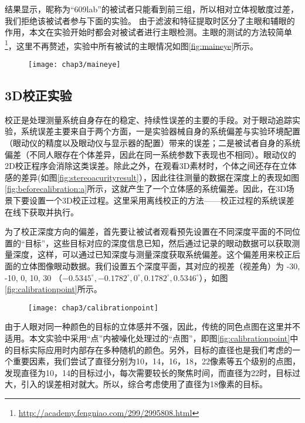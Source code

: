 结果显示，昵称为“609lab”的被试者只能看到前三组，所以相对立体视敏度过差，我们拒绝该被试者参与下面的实验。
由于滤波和特征提取时区分了主眼和辅眼的作用，本文在实验开始时都会对被试者进行主眼检测。主眼的测试的方法较简单\footnote{\url{http://academy.fengniao.com/299/2995808.html}}，这里不再赘述，实验中所有被试的主眼情况如图\ref{fig:maineye}所示。
\begin{figure}[!htp]
  \centering
  \texttt{[image: chap3/maineye]}
\end{figure}
\subsection{3D校正实验}
\label{sec:3dcalibrationexperiment}
校正是处理测量系统自身存在的稳定、持续性误差的主要的手段。对于眼动追踪实验，系统误差主要来自于两个方面，一是实验器械自身的系统偏差与实验环境配置（眼动仪的精度以及眼动仪与显示器的配置）带来的误差；二是被试者自身的系统偏差（不同人眼存在个体差异，因此在同一系统参数下表现也不相同）。眼动仪的2D校正程序会消除这类误差。除此之外，在观看3D素材时，个体之间还存在立体感的差异(如图\ref{fig:stereoacurityresult}），因此往往测量的数据在深度上的表现如图\ref{fig:beforecalibration:a}所示，这就产生了一个立体感的系统偏差。因此，在3D场景下要设置一个3D校正过程。这里采用离线校正的方法——校正过程的系统误差在线下获取并执行。

为了校正深度方向的偏差，首先要让被试者观看预先设置在不同深度平面的不同位置的“目标”，这些目标对应的深度信息已知，然后通过记录的眼动数据可以获取测量深度，这样，可以通过已知深度与测量深度获取系统偏差。这个偏差用来校正后面的立体图像眼动数据。我们设置五个深度平面，其对应的视差（视差角）为 -30, -10, 0, 10, 30  （$ -{0.5345^\circ }, -{0.1782^\circ }, {0^\circ }, {0.1782^\circ }, {0.5346^\circ }$），如图\ref{fig:calibrationpoint}所示。
\begin{figure}[!htp]
  \centering
  \texttt{[image: chap3/calibrationpoint]}
\end{figure}
由于人眼对同一种颜色的目标的立体感并不强\parencite{holliman2007application}，因此，传统的同色点图在这里并不适用。本文实验中采用“点”内被噪化处理过的“点图”，即图\ref{fig:calibrationpoint}中的目标实际应用时内部存在多种随机的颜色。另外，目标的直径也是我们考虑的一个重要因素，我们尝试了直径分别为10，14，16，18，22像素等五个级别的点图，发现直径为10，14的目标过小，每次需要较长的聚焦时间，而直径为22时，目标过大，引入的误差相对就大。所以，综合考虑使用了直径为18像素的目标。

